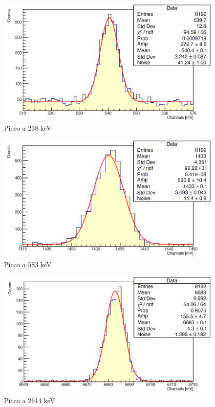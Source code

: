\documentclass[a4paper,10pt]{article}
\begin{document}
\begin{figure}[H]
    \centering
    \includegraphics[scale=0.45]{appendice/spettri/ThPb1_33}
    \caption{Picco a 238 keV}
\end{figure}
\begin{figure}[H]
    \centering
    \includegraphics[scale=0.45]{appendice/spettri/ThPb2_33}
    \caption{Picco a 583 keV}
\end{figure}
\begin{figure}[H]
    \centering
    \includegraphics[scale=0.45]{appendice/spettri/ThPb3_33}
    \caption{Picco a 2614 keV}
\end{figure}
\end{document}
